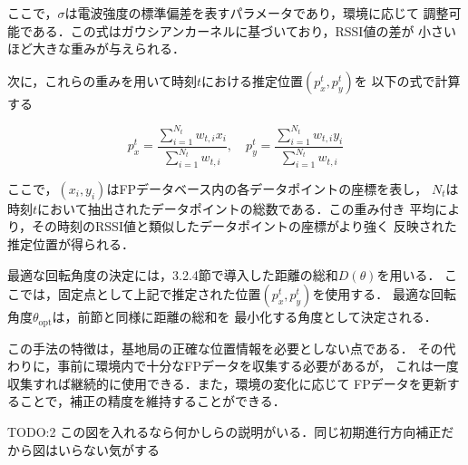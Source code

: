 ここで，$\sigma$は電波強度の標準偏差を表すパラメータであり，環境に応じて
調整可能である．この式はガウシアンカーネルに基づいており，RSSI値の差が
小さいほど大きな重みが与えられる．

次に，これらの重みを用いて時刻$t$における推定位置$(p_x^t, p_y^t)$を
以下の式で計算する

\begin{equation}
p_x^t = \frac{\sum_{i=1}^{N_t} w_{t,i} x_i}{\sum_{i=1}^{N_t} w_{t,i}}, \quad
p_y^t = \frac{\sum_{i=1}^{N_t} w_{t,i} y_i}{\sum_{i=1}^{N_t} w_{t,i}}
\end{equation}

ここで，$(x_i, y_i)$はFPデータベース内の各データポイントの座標を表し，
$N_t$は時刻$t$において抽出されたデータポイントの総数である．この重み付き
平均により，その時刻のRSSI値と類似したデータポイントの座標がより強く
反映された推定位置が得られる．

最適な回転角度の決定には，3.2.4節で導入した距離の総和$D(\theta)$を用いる．
ここでは，固定点として上記で推定された位置$(p_x^t, p_y^t)$を使用する．
最適な回転角度$\theta_{\mathrm{opt}}$は，前節と同様に距離の総和を
最小化する角度として決定される．

この手法の特徴は，基地局の正確な位置情報を必要としない点である．
その代わりに，事前に環境内で十分なFPデータを収集する必要があるが，
これは一度収集すれば継続的に使用できる．また，環境の変化に応じて
FPデータを更新することで，補正の精度を維持することができる．


TODO:2 この図を入れるなら何かしらの説明がいる．同じ初期進行方向補正だから図はいらない気がする



